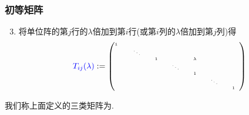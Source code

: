 \begin{frame}\frametitle{初等矩阵}
\begin{definition}[初等矩阵]
\begin{enumerate}\setcounter{enumi}{2}
\item 将单位阵的第$j$行的$\lambda$倍加到第$i$行(或第$i$列的$\lambda$倍加到第$j$列)得
\[\tiny \blue{T_{ij}(\lambda)} := \begin{pmatrix}
1\quad&\qquad&\qquad&\qquad&\qquad&\qquad&\qquad\\
&\ddots&      &      &       &      &     \\
&      &  1   &      &\lambda&      &     \\
&      &      &\ddots&       &      &     \\
&      &      &      &  1    &      &     \\
&      &      &      &       &\ddots&     \\
&      &      &      &       &      &  1  \\
\end{pmatrix}\]
\end{enumerate}
\pp
我们称上面定义的三类矩阵为.
\end{definition}

\end{frame}














